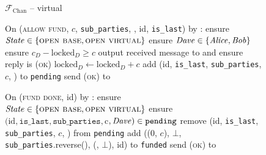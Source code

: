 \begin{figure}[H]
\begin{systembox}{$\mathcal{F}_{\mathrm{Chan}}$ -- virtual}
\begin{algorithmic}[1]
      \State On (\textsc{allow fund}, $c$, \texttt{sub\_parties}, \dave, id,
      \texttt{is\_last}) by \charlie:
      \label{code:functionality:chan:skeleton:virtual:allow-fund}
      \Indent
        \State ensure $\mathit{State} \in \{\textsc{open base}, \textsc{open
        virtual}\}$
        \State ensure $\mathit{Dave} \in \{\mathit{Alice}, \mathit{Bob}\}$
        \State ensure $c_D - \mathrm{locked}_D \geq c$
        \State output received message to \dave and ensure reply is
        \textsc{(ok)}
        \State $\mathrm{locked}_D \gets \mathrm{locked}_D + c$
        \State add (id, \texttt{is\_last}, \texttt{sub\_parties}, $c$, \dave) to
        \texttt{pending}
        \State send (\textsc{ok}) to \charlie
      \EndIndent
      \Statex

      \State On (\textsc{fund done}, id) by \charlie:
      \Indent
        \State ensure $\mathit{State} \in \{\textsc{open base}, \textsc{open
        virtual}\}$
        \State ensure $(\mathrm{id}, \mathtt{is\_last}, \mathtt{sub\_parties},
        $c$, \mathit{Dave}) \in \mathtt{pending}$
        \State remove (id, \texttt{is\_last}, \texttt{sub\_parties}, $c$, \dave)
        from \texttt{pending}
          \State add ((0, $c$), $\bot$, \texttt{sub\_parties}.reverse(),
          (\dave, $\bot$), id) to \texttt{funded}
        \EndIf
        \State send (\textsc{ok}) to \charlie
      \EndIndent
    \end{algorithmic}
  \end{systembox}
  \caption{}
  \label{code:functionality:chan:skeleton:virtual}
\end{figure}

